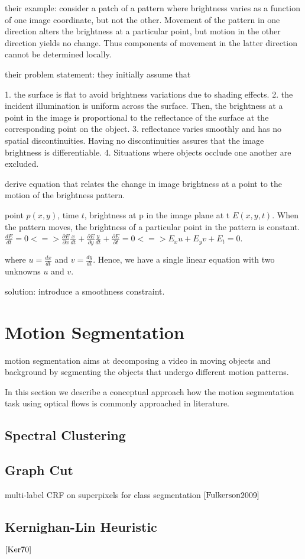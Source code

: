 their example: consider a patch of a pattern where brightness varies as a function of one image coordinate, but not the other. Movement of the pattern in one direction alters the brightness at a particular point, but motion in the other direction yields no change. Thus components of movement in the latter direction cannot be determined locally.

their problem statement:
they initially assume that 

1. the surface is flat to avoid brightness variations due to shading effects.
2. the incident illumination is uniform across the surface. Then, the brightness at a point in the image is proportional to the reflectance of the surface at the corresponding point on the object.
3. reflectance varies smoothly and has no spatial discontinuities. Having no discontinuities assures that the image brightness is differentiable.
4. Situations where objects occlude one another are excluded.

derive equation that relates the change in image brightness at a point to the motion of the brightness pattern.

point $p(x,y)$, time $t$, brightness at p in the image plane at t $E(x,y,t)$.
When the pattern moves, the brightness of a particular point in the pattern is constant. 
$\frac{d E}{dt} = 0 <=> \frac{\partial E}{\partial x} \frac{x}{dt} + \frac{\partial E}{\partial y} \frac{y}{dt} + \frac{\partial E}{\partial t} = 0 <=> E_{x} u + E_{y} v + E_{t} = 0$.

where $u = \frac{dx}{dt}$ and $v = \frac{dy}{dt}$. Hence, we have a single linear equation with two unknowns $u$ and $v$.

solution: introduce a smoothness constraint.


\section{Motion Segmentation}
motion segmentation aims at decomposing a video in moving objects and background by segmenting the objects that undergo different motion patterns.

In this section we describe a conceptual approach how the motion segmentation task using optical flows is commonly approached in literature. 

\subsection{Spectral Clustering}
\subsection{Graph Cut}

multi-label CRF on superpixels for class segmentation $\cite{Fulkerson2009}$

\subsection{Kernighan-Lin Heuristic}


$\cite{Ker70}$
